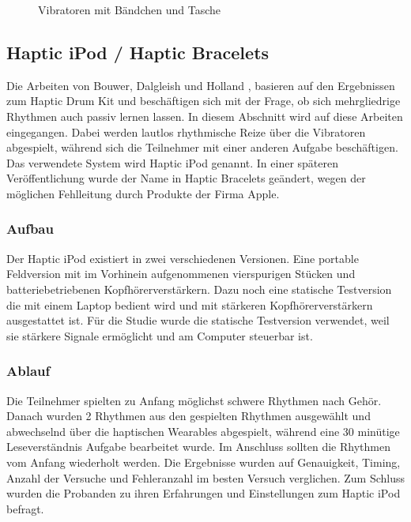 \documentclass[ngerman,runningheads,a4paper]{llncs}
\begin{document}
\begin{figure}[H]
\begin{minipage}[b]{0.4\textwidth}
    \caption{Vibratoren mit Bändchen und Tasche \cite{10.1145/1709886.1709892}}
    \label{hapkit2}
  \end{minipage}
\end{figure}


\subsection{Haptic iPod / Haptic Bracelets}
Die Arbeiten von Bouwer, Dalgleish und Holland \cite{bouwer2011haptic}, \cite{bouwer2013haptic} basieren auf den Ergebnissen zum Haptic Drum Kit \cite{10.1145/1709886.1709892} und beschäftigen sich mit der Frage, ob sich mehrgliedrige Rhythmen auch passiv lernen lassen. In diesem Abschnitt wird auf diese Arbeiten eingegangen.
Dabei werden lautlos rhythmische Reize über die Vibratoren abgespielt, während sich die Teilnehmer mit einer anderen Aufgabe beschäftigen.
Das verwendete System wird Haptic iPod genannt. In einer späteren Veröffentlichung wurde der Name in Haptic Bracelets geändert, wegen der möglichen Fehlleitung durch Produkte der Firma Apple.
\subsubsection{Aufbau}
Der Haptic iPod existiert in zwei verschiedenen Versionen.
Eine portable Feldversion mit im Vorhinein aufgenommenen vierspurigen Stücken und batteriebetriebenen Kopfhörerverstärkern.
Dazu noch eine statische Testversion die mit einem Laptop bedient wird und mit stärkeren Kopfhörerverstärkern ausgestattet ist.
Für die Studie wurde die statische Testversion verwendet, weil sie stärkere Signale ermöglicht und am Computer steuerbar ist.

\subsubsection{Ablauf}
Die Teilnehmer spielten zu Anfang möglichst schwere Rhythmen nach Gehör.
Danach wurden 2 Rhythmen aus den gespielten Rhythmen ausgewählt und abwechselnd über die haptischen Wearables abgespielt, während eine 30 minütige Leseverständnis Aufgabe bearbeitet wurde.
Im Anschluss sollten die Rhythmen vom Anfang wiederholt werden.
Die Ergebnisse wurden auf Genauigkeit, Timing, Anzahl der Versuche und Fehleranzahl im besten Versuch verglichen.
Zum Schluss wurden die Probanden zu ihren Erfahrungen und Einstellungen zum Haptic iPod befragt.
\end{document}
